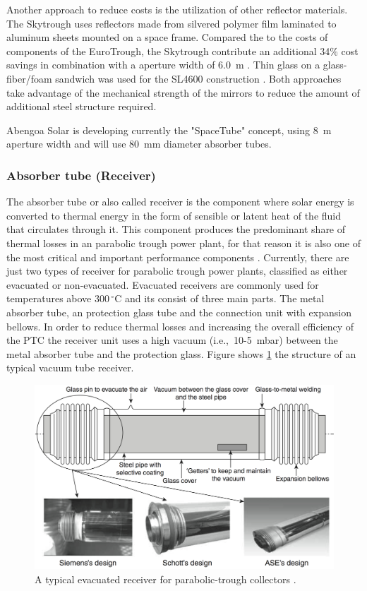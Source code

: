 Another approach to reduce costs is the utilization of other reflector materials. The Skytrough uses reflectors made from silvered polymer film laminated to aluminum sheets mounted on a space frame. Compared the to the costs of components of the EuroTrough, the Skytrough contribute an additional 34\% cost savings in combination with a aperture width of 6.0~m \cite{Mason2014}. Thin glass on a glass-fiber/foam sandwich was used for the SL4600 construction \cite{SolarliteCSPTechnologyGmbH2014}. Both approaches take advantage of the mechanical strength of the mirrors to reduce the amount of additional steel structure required.

Abengoa Solar is developing currently the "SpaceTube" concept, using 8~m aperture width and will use 80~mm diameter absorber tubes. \cite{Olar2013}
\pagebreak
\subsubsection{Absorber tube (Receiver)}
The absorber tube or also called receiver is the component where solar energy is converted to thermal energy in the form of sensible or latent heat of the fluid that circulates through it. This component produces the predominant share of thermal losses in an parabolic trough power plant, for that reason it is also one of the most critical and important performance components \cite{Lupfert2013}. Currently, there are just two types of receiver for parabolic trough power plants, classified as either evacuated or non-evacuated. Evacuated receivers are commonly used for temperatures above 300$\,^{\circ}\mathrm{C}$ and its consist of three main parts. The metal absorber tube, an protection glass tube and the connection unit with expansion bellows. In order to reduce thermal losses and increasing the overall efficiency of the PTC the receiver unit uses a high vacuum (i.e.,~10-5~mbar) between the metal absorber tube and the protection glass. Figure shows \ref{absorber_tube} the structure of an typical vacuum tube receiver. 
\begin{figure}[!h] 
\centering
\includegraphics[width=0.9\linewidth]{FIG/absorber_tube}
\caption[A typical evacuated receiver for parabolic-trough collectors.]{A typical evacuated receiver for parabolic-trough collectors \cite{Moya2012}.}\label{absorber_tube}
\end{figure}
\\

